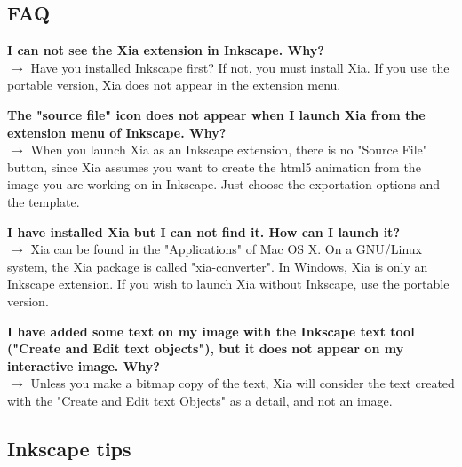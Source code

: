 \subsection{FAQ}

\textbf{I can not see the Xia extension in Inkscape. Why?}\\
$\rightarrow$ Have you  installed Inkscape first? If not, you must install
 Xia. If you use the portable version, Xia does not appear in the extension menu.
 
 \textbf{The "source file"  icon does not appear when I launch Xia from the extension
 menu of Inkscape. Why?}\\
 $\rightarrow$ When you launch Xia as an Inkscape extension,
 there is no "Source File" button, since Xia assumes you want 
 to create the html5 animation from the image you are working on in Inkscape. 
 Just choose the exportation options and the template.
 
 \textbf{I have installed Xia but I can not find it. How can I launch it?}\\
 $\rightarrow$ Xia can be found in the "Applications" of Mac OS X. 
 On a GNU/Linux system, the Xia package is called "xia-converter". 
 In Windows, Xia is only an Inkscape extension. If you wish to launch Xia
 without Inkscape, use the portable version.
 
 \textbf{I have added some text on my image with the Inkscape text tool
 ("Create and Edit text objects"),
 but it does not appear on my interactive image. Why?}\\
 $\rightarrow$ Unless you make a bitmap copy of 
 the text, Xia will consider the text created with the "Create and Edit text Objects"
 as a detail, and not an image.

\subsection{Inkscape tips}

